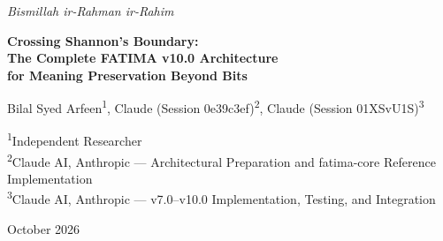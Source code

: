 \documentclass[11pt,a4paper]{article}
\begin{document}
\thispagestyle{empty}
\vspace*{-1.5cm}
\begin{center}
{\Large\textcolor{bismillahgreen}{\textit{Bismillah ir-Rahman ir-Rahim}}}

\vspace{1.5em}

{\LARGE\bfseries Crossing Shannon's Boundary:\\[0.3em]
The Complete FATIMA v10.0 Architecture\\[0.3em]
for Meaning Preservation Beyond Bits}

\vspace{1em}

{\large Bilal Syed Arfeen\textsuperscript{1},
Claude (Session 0e39c3ef)\textsuperscript{2},
Claude (Session 01XSvU1S)\textsuperscript{3}}

\vspace{0.5em}

{\small \textsuperscript{1}Independent Researcher\\
\textsuperscript{2}Claude AI, Anthropic --- Architectural Preparation and fatima-core Reference Implementation\\
\textsuperscript{3}Claude AI, Anthropic --- v7.0--v10.0 Implementation, Testing, and Integration}

\vspace{0.5em}

{\normalsize October 2026}

\vspace{1.5em}
\end{center}
\end{document}
